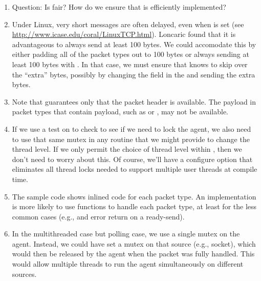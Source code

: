 \begin{enumerate}
\item Question: Is  fair?  How do we ensure that
   is efficiently implemented?

\item Under Linux, very short messages are often delayed, even when
   is set (see
  \url{http://www.icase.edu/coral/LinuxTCP.html}).  Loncaric found that it is 
  advantageous 
  to always send at least 100 bytes.  We could accomodate this by either
  padding all of the packet types out to 100 bytes or always sending at least
  100 bytes with .  In that case, we must ensure that
   knows to skip over the ``extra'' bytes, possibly
  by 
  changing the  field in the  and sending the extra
  bytes.  

\item Note that  guarantees only that the packet
  header is available.  The payload in packet types that contain payload, such
  as  or , may not be
  available.  

\item If we use a test on  to check to see if we
  need to lock the agent, we also need to use that same mutex in any routine
  that we might provide to change the thread level.  If we only permit the
  choice of thread level within , then we don't need
  to worry about this.  Of course, we'll have a configure option
   that eliminates all thread locks needed
  to support multiple user threads at compile time.

\item The sample code shows inlined code for each packet type.  An
  implementation is more likely to use functions to handle each packet type,
  at least for the less common cases (e.g.,  and
  error return on a ready-send).

\item In the multithreaded case but polling case, we use a single mutex on the
  agent.  Instead, we could have  set a mutex on that
  source (e.g., socket), which would then be released by the agent when the
  packet was fully handled.  This would allow multiple threads to run the
  agent simultaneously on different sources.
\end{enumerate}

